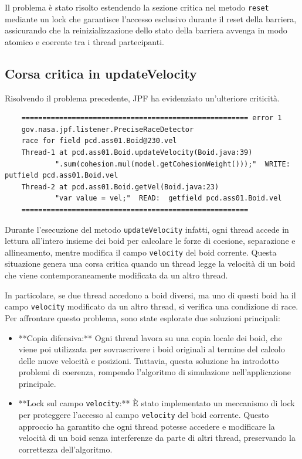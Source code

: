 \documentclass[a4paper,12pt]{report}
\begin{document}
Il problema è stato risolto estendendo la sezione critica nel metodo \texttt{reset} mediante un lock che garantisce l'accesso esclusivo durante il reset della barriera, assicurando che la reinizializzazione dello stato della barriera avvenga in modo atomico e coerente tra i thread partecipanti.

\subsection{Corsa critica in updateVelocity}
Risolvendo il problema precedente, JPF ha evidenziato un'ulteriore criticità.

\begin{verbatim}
    ====================================================== error 1
    gov.nasa.jpf.listener.PreciseRaceDetector
    race for field pcd.ass01.Boid@230.vel
    Thread-1 at pcd.ass01.Boid.updateVelocity(Boid.java:39)
            ".sum(cohesion.mul(model.getCohesionWeight()));"  WRITE: putfield pcd.ass01.Boid.vel
    Thread-2 at pcd.ass01.Boid.getVel(Boid.java:23)
            "var value = vel;"  READ:  getfield pcd.ass01.Boid.vel
    ======================================================
\end{verbatim}

Durante l'esecuzione del metodo \texttt{updateVelocity} infatti, ogni thread accede in lettura all'intero insieme dei boid per calcolare le forze di coesione, separazione e allineamento, mentre modifica il campo \texttt{velocity} del boid corrente. Questa situazione genera una corsa critica quando un thread legge la velocità di un boid che viene contemporaneamente modificata da un altro thread.

In particolare, se due thread accedono a boid diversi, ma uno di questi boid ha il campo \texttt{velocity} modificato da un altro thread, si verifica una condizione di race. Per affrontare questo problema, sono state esplorate due soluzioni principali:

\begin{itemize}
    \item **Copia difensiva:** Ogni thread lavora su una copia locale dei boid, che viene poi utilizzata per sovrascrivere i boid originali al termine del calcolo delle nuove velocità e posizioni. Tuttavia, questa soluzione ha introdotto problemi di coerenza, rompendo l'algoritmo di simulazione nell'applicazione principale.
    \item **Lock sul campo \texttt{velocity}:** È stato implementato un meccanismo di lock per proteggere l'accesso al campo \texttt{velocity} del boid corrente. Questo approccio ha garantito che ogni thread potesse accedere e modificare la velocità di un boid senza interferenze da parte di altri thread, preservando la correttezza dell'algoritmo.
\end{itemize}
\end{document}

